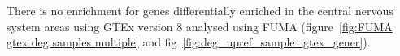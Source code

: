 There is no enrichment for genes differentially enriched in the central nervous system areas using GTEx version 8 analysed using FUMA (figure~\ref{fig:FUMA gtex deg samples multiple} and fig~\ref{fig:deg_upref_sample_gtex_gener}).











